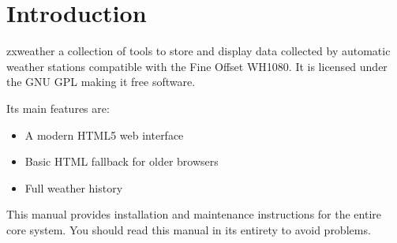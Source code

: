 \documentclass[a4paper,10pt,draft]{book}
\newcommand{\partnumber}{\ifthenelse{\isundefined{\projectnum}}{}{\projectnum-\docnum	\ifthenelse{\equal{\docrev}{001}}{}{.\docrev}}}
\begin{document}

\ifthenelse{\isundefined{\ordernumber}}{

\title{\doctitle{} - \docsubtitle}
\author{\docauthor}
}{

\title{\doctitle}
\subtitle{\docsubtitle}
\titleabstract{\docabstract}
\ordernumber{\partnumber}
\updateinfo{\docupdateinfo}
\osinfo{\docosver}
\swversion{\docswver}
\titlecopyright{\doccopyright}
\licensestatement{\doclicense}
}
\date{\docdate}

\maketitle

\clearpage

\tableofcontents
\clearpage



\chapter{Introduction}
\setcounter{page}{1}

zxweather a collection of tools to store and display data collected by automatic weather stations compatible with the Fine Offset WH1080. It is licensed under the GNU GPL making it free software.

Its main features are:
\begin{itemize}
\item A modern HTML5 web interface
\item Basic HTML fallback for older browsers
\item Full weather history
\end{itemize}

This manual provides installation and maintenance instructions for the entire core system. You should read this manual in its entirety to avoid problems.
\end{document}
